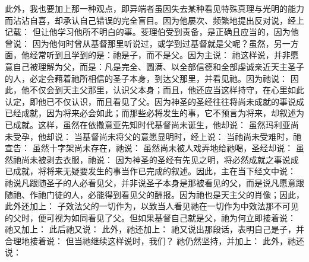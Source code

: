 此外，我也要加上那一种观点，即异端者虽因失去某种看见特殊真理与光明的能力而沾沾自喜，却承认自己错误的完全盲目。因为他屡次、频繁地提出反对说，经上记载： 但让他学习他所不明白的事。斐理伯受到责备，是正确且应当的，因为他曾说： 因为他何时曾从基督那里听说过，或学到过基督就是父呢？虽然，另一方面，他经常听到且学到的是：祂是子，而不是父。因为主说： 祂这样说，并非愿意自己被理解为父，而是：凡是完全、圆满、以全部信德和全部虔诚亲近天主圣子的人，必定会藉着祂所相信的圣子本身，到达父那里，并看见祂。因为祂说： 因此，他不仅会到天主父那里，认识父本身；而且，他还应当这样持守，在心里如此认定，即他已不仅认识，而且看见了父。因为神圣的圣经往往将尚未成就的事说成已经成就，因为将来必会如此；而那些必将发生的事，它不预言为将来，却叙述为已成就。这样，虽然在依撒意亚先知时代基督尚未诞生，他却说： 虽然玛利亚尚未受孕，他却说： 当基督尚未将父的意愿显明时，经上说： 当祂尚未受难时，祂宣告： 虽然十字架尚未存在，祂说： 虽然尚未被人戏弄地给祂喝，圣经却说： 虽然祂尚未被剥去衣服，祂说： 因为神圣的圣经有先见之明，将必然成就之事说成已成就，将将来无疑要发生的事当作已完成的叙述。因此，主在当下经文中说： 祂说凡跟随圣子的人必看见父，并非说圣子本身是那被看见的父，而是说凡愿意跟随祂、作祂门徒的人，必能得到看见父的酬报。因为祂也是天主父的肖像；因此，此外还加上： 子效法父的一切作为，以致当人看见祂在一切作为中效法那不可见的父时，便可视为如同看见了父。但如果基督自己就是父，祂为何立即接着说： 祂又加上： 此后祂又说： 此外，祂还加上： 祂又说出那段话，表明自己是子，并合理地接着说： 但当祂继续这样说时，我们？ 祂仍然坚持，并加上： 此外，祂还说： 